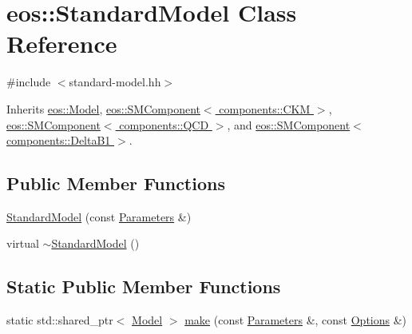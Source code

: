 \hypertarget{classeos_1_1StandardModel}{
\section{eos::StandardModel Class Reference}
\label{classeos_1_1StandardModel}
}


{\ttfamily \#include $<$standard-\/model.hh$>$}

Inherits \hyperlink{classeos_1_1Model}{eos::Model}, \hyperlink{classeos_1_1SMComponent_3_01components_1_1CKM_01_4}{eos::SMComponent$<$ components::CKM $>$}, \hyperlink{classeos_1_1SMComponent_3_01components_1_1QCD_01_4}{eos::SMComponent$<$ components::QCD $>$}, and \hyperlink{classeos_1_1SMComponent_3_01components_1_1DeltaB1_01_4}{eos::SMComponent$<$ components::DeltaB1 $>$}.\subsection*{Public Member Functions}
\begin{DoxyCompactItemize}
\item 
\hyperlink{classeos_1_1StandardModel_a45216b3c32798230199b30a851bf93de}{StandardModel} (const \hyperlink{classeos_1_1Parameters}{Parameters} \&)
\item 
virtual \hyperlink{classeos_1_1StandardModel_afb4b2be07ec8a7df31889ad89a6a0bf8}{$\sim$StandardModel} ()
\end{DoxyCompactItemize}
\subsection*{Static Public Member Functions}
\begin{DoxyCompactItemize}
\item 
static std::shared\_\-ptr$<$ \hyperlink{classeos_1_1Model}{Model} $>$ \hyperlink{classeos_1_1StandardModel_ae94ae93a0f5a53b3bbe545ba26a82b13}{make} (const \hyperlink{classeos_1_1Parameters}{Parameters} \&, const \hyperlink{classeos_1_1Options}{Options} \&)
\end{DoxyCompactItemize}


